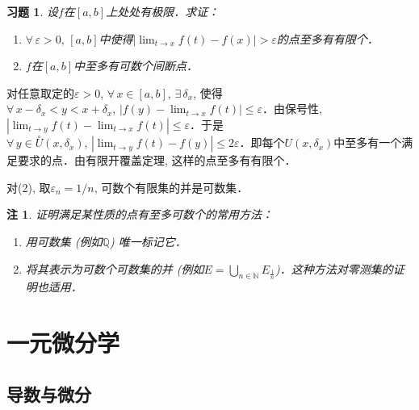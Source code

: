 \documentclass[11pt,a4paper]{ctexart}
\makeatletter
\theoremstyle{thmseries} %
\newtheorem{thm}{定理}[section]
\theoremstyle{exerseries}
\newtheorem{exer}{习题}[section]
\newtheorem*{rem}{注}
\renewenvironment{proof}[1][\proofname]{\par
  \pushQED{\qed}%
  \normalfont \topsep6\p@\@plus6\p@\relax
  \trivlist
  \item[\hskip\labelsep
        \itshape
    #1\@addpunct{}]\ignorespaces
}{%
  \popQED\endtrivlist\@endpefalse
}
\newenvironment{pf}{\begin{proof}[\bfseries\upshape 证\quad]}{\end{proof}}
\newcommand{\bra}[1]{\mathopen{}\left(#1\right)}
\renewcommand{\epsilon}{\varepsilon}
\renewcommand{\phi}{\varphi}
\newcommand{\dnei}{\overset{\circ}{U}}
\newcommand{\N}{\mathbb{N}}
\newcommand{\Q}{\mathbb{Q}}
\makeatother
\begin{document}
\begin{exer}
	设$f$在$[a,b]$上处处有极限．求证：
	\begin{enumerate}
		\item $\forall\,\epsilon>0,\,[a,b]$中使得$|\lim_{t\to x}f(t)-f(x)|>\epsilon$的点至多有有限个．
		\item $f$在$[a,b]$中至多有可数个间断点．
	\end{enumerate}
\end{exer}
\begin{pf}
	对任意取定的$\epsilon>0$, $\forall\,x\in[a,b],\,\exists\,\delta_x$, 使得$\forall\,x-\delta_x<y<x+\delta_x,\,|f(y)-\lim_{t\to x}f(t)|\leq\epsilon$．由保号性, $|\lim_{t\to y}f(t)-\lim_{t\to x}f(t)|\leq\epsilon$．于是$\forall\,y\in\dnei(x,\delta_x),\,|\lim_{t\to y}f(t)-f(y)|\leq2\epsilon$．即每个$U(x,\delta_x)$中至多有一个满足要求的点．由有限开覆盖定理, 这样的点至多有有限个．

	对(2), 取$\epsilon_n=1/n$, 可数个有限集的并是可数集．
\end{pf}
\begin{rem}
	证明满足某性质的点有至多可数个的常用方法：
	\begin{enumerate}
		\item 用可数集 (例如$\Q$) 唯一标记它．
		\item 将其表示为可数个可数集的并 (例如$E=\bigcup_{n\in \N}E_{\frac{1}{n}}$)．这种方法对零测集的证明也适用．
	\end{enumerate}
\end{rem}


\section{一元微分学}
\subsection{导数与微分}

\end{document}
